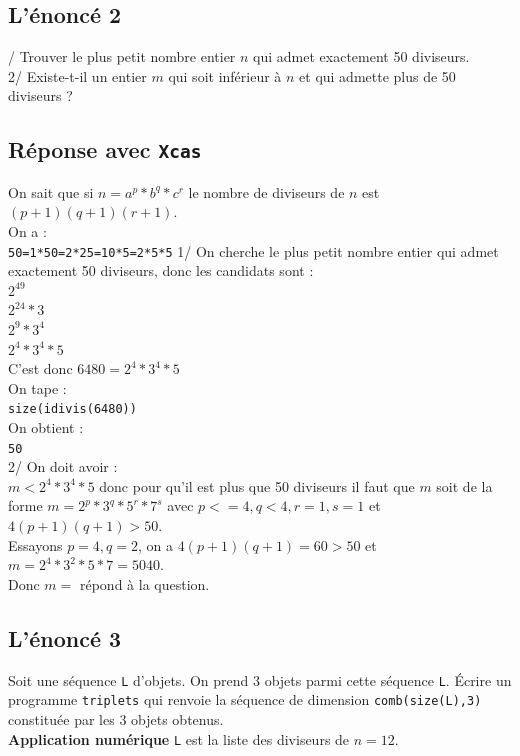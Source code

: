 \documentclass[a4paper,11pt]{book}
\begin{document}
\subsection{L'\'enonc\'e 2}
/ Trouver le plus petit nombre entier $n$ qui admet exactement 50 
diviseurs.\\
2/ Existe-t-il un entier $m$ qui soit inf\'erieur \`a $n$ et qui admette plus 
de 50 diviseurs ?
\subsection{R\'eponse avec {\tt Xcas}}
\noindent On sait que si $n=a^p*b^q*c^r$ le nombre de diviseurs de $n$ est 
$(p+1)(q+1)(r+1)$.\\
On a :\\
{\tt 50=1*50=2*25=10*5=2*5*5} 
1/ On cherche le plus petit nombre entier qui admet exactement 50 diviseurs, 
donc les candidats sont :\\
$2^{49}$\\
$2^{24}*3$\\
$2^9*3^4$\\
$2^4*3^4*5$\\
C'est donc $6480=2^4*3^4*5$\\
On tape :\\
{\tt size(idivis(6480))}\\
On obtient :\\
{\tt 50}\\
2/ On doit avoir :\\
$m<2^4*3^4*5$ donc pour qu'il est plus que 50 diviseurs il faut que $m$ soit de
la forme $m=2^p*3^q*5^r*7^s$ avec $p<=4,q<4,r=1,s=1$ et $4(p+1)(q+1)>50$.\\
Essayons $p=4,q=2$, on a $4(p+1)(q+1)=60>50$ et $m=2^4*3^2*5*7=5040$.\\
Donc $m=$ r\'epond \`a la question.
\subsection{L'\'enonc\'e 3}
Soit une s\'equence {\tt L} d'objets. On prend 3 objets parmi cette s\'equence
{\tt L}. \'Ecrire un programme {\tt triplets} qui renvoie la s\'equence de 
dimension {\tt comb(size(L),3)} constitu\'ee par les 3 objets obtenus.\\
{\bf Application num\'erique}
{\tt L} est la liste des diviseurs de $n=12$.
\end{document}
